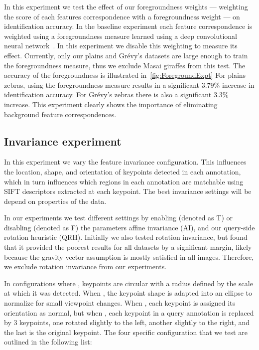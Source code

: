         In this experiment we test the effect of our foregroundness weights --- weighting the score of each
          features correspondence with a foregroundness weight --- on identification accuracy.
        In the baseline experiment each feature correspondence is weighted using a foregroundness measure learned
          using a deep convolutional neural network~\cite{parham_photographic_2015}.
        In this experiment we disable this weighting to measure its effect.
        Currently, only our plains and Grévy's datasets are large enough to train the foregroundness measure,
          thus we exclude Masai giraffes from this test.
        The accuracy of the foregroundness is illustrated in~\cref{fig:ForegroundExpt} For plains zebras, using
          the foregroundness measure results in a significant $3.79\percent$ increase in identification accuracy.
        For Grévy's zebras there is also a significant $3.3\percent$ increase.
        This experiment clearly shows the importance of eliminating background feature correspondences.
     
    \subsection{Invariance experiment}\label{sub:exptinvar} %
        In this experiment we vary the feature invariance configuration.
        This influences the location, shape, and orientation of keypoints detected in each annotation, which in
          turn influences which regions in each annotation are matchable using SIFT descriptors extracted at each
          keypoint.
        The best invariance settings will be depend on properties of the data.

        In our experiments we test different settings by enabling (denoted as T) or disabling (denoted as F) the
          parameters affine invariance (AI), and our query-side rotation heuristic (QRH).
        Initially we also tested rotation invariance, but found that it provided the poorest results for all
          datasets by a significant margin, likely because the gravity vector assumption is mostly satisfied in all
          images.
        Therefore, we exclude rotation invariance from our experiments.

        In configurations where , keypoints are circular with a radius defined by the scale at which
          it was detected.
        When , the keypoint shape is adapted into an ellipse to normalize for small viewpoint changes.
        When , each keypoint is assigned its orientation as normal, but when , each
          keypoint in a query annotation is replaced by 3 keypoints, one rotated slightly to the left, another
          slightly to the right, and the last is the original keypoint.
        The four specific configuration that we test are outlined in the following list:

